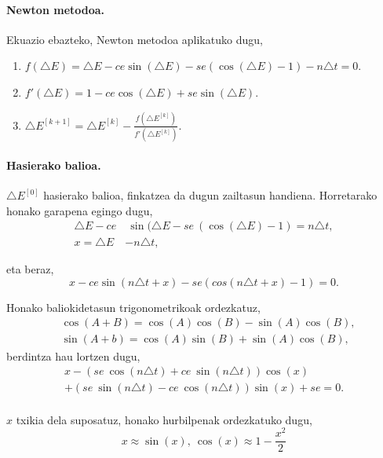 \paragraph*{Newton metodoa.}Ekuazio ebazteko, Newton metodoa aplikatuko dugu,

\begin{enumerate}
\item $f(\triangle E)=\triangle E - ce \sin(\triangle E)- se (\cos(\triangle E)-1)-n \triangle t=0$.

\item $f'(\triangle E)=1-ce \cos(\triangle E)+ se \sin(\triangle E)$.

\item $\triangle E^{[k+1]}=\triangle E^{[k]}- \frac{f(\triangle E^{[k]})}{f'(\triangle E^{[k]})}$.

\end{enumerate}

\paragraph*{Hasierako balioa.} $\triangle E^{[0]}$ hasierako balioa, finkatzea da dugun zailtasun handiena. Horretarako honako garapena egingo dugu,
\begin{align*}
\triangle E - ce& \ \sin(\triangle E- se \ (\cos(\triangle E)-1)=n \triangle t, \\
x= \triangle E &- n \triangle t,
\end{align*}

eta beraz,
\begin{equation*}
x-ce \sin(n\triangle t+x)-se(cos(n \triangle t+x)-1)=0.
\end{equation*}

Honako baliokidetasun trigonometrikoak ordezkatuz,
\begin{align*}
& \cos(A+B) =\cos(A)\cos(B)-\sin(A)\cos(B),\\
& \sin(A+b) =\cos(A)\sin(B)+\sin(A)\cos(B),
\end{align*}
berdintza hau lortzen dugu,
\begin{multline*}
x- (se \ \cos(n \triangle t)+ ce \ \sin(n \triangle t)) \cos(x) \\
    + (se \ \sin(n \triangle t)-ce \ \cos(n \triangle t)) \sin(x)+se =0.
\end{multline*}

\paragraph*{}$x$ txikia dela suposatuz, honako hurbilpenak ordezkatuko dugu,
\begin{equation*}
x \approx \sin(x), \ \cos(x) \approx 1- \frac{x^2}{2}
\end{equation*}

